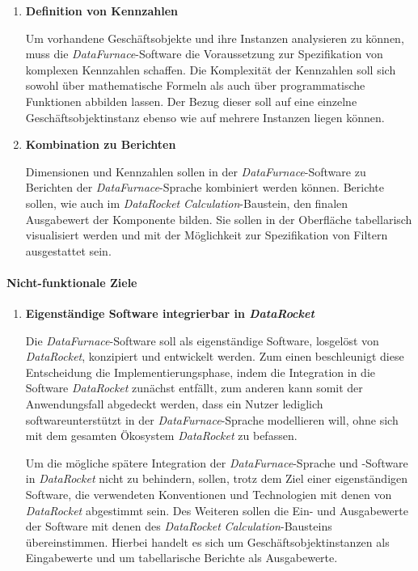 \documentclass[
  language=german, %
  type=bachelor%
]{isthesis}
\begin{document}
\begin{content}
\begin{enumerate}
    \item \textbf{Definition von Kennzahlen}

      Um vorhandene Geschäftsobjekte und ihre Instanzen analysieren zu können,
      muss die \textit{DataFurnace}-Software die Voraussetzung zur
      Spezifikation von komplexen Kennzahlen schaffen. Die Komplexität der
      Kennzahlen soll sich sowohl über mathematische Formeln als auch
      über programmatische Funktionen abbilden lassen. Der Bezug dieser soll auf
      eine einzelne Geschäftsobjektinstanz ebenso wie auf mehrere Instanzen
      liegen können.

    \item \textbf{Kombination zu Berichten}

      Dimensionen und Kennzahlen sollen in der \textit{DataFurnace}-Software zu
      Berichten der \textit{DataFurnace}-Sprache kombiniert werden können.
      Berichte sollen, wie auch im \textit{DataRocket}
      \textit{Calculation}-Baustein, den finalen Ausgabewert der Komponente
      bilden. Sie sollen in der Oberfläche tabellarisch visualisiert werden und
      mit der Möglichkeit zur Spezifikation von Filtern ausgestattet sein.

  \end{enumerate}

  \paragraph{Nicht-funktionale Ziele}
  \begin{enumerate}

    \item \textbf{Eigenständige Software integrierbar in \textit{DataRocket}}

      Die \textit{DataFurnace}-Software soll als eigenständige Software,
      losgelöst von \textit{DataRocket}, konzipiert und entwickelt werden. Zum
      einen beschleunigt diese Entscheidung die Implementierungsphase, indem
      die Integration in die Software \textit{DataRocket} zunächst entfällt,
      zum anderen kann somit der Anwendungsfall abgedeckt werden, dass ein Nutzer
      lediglich softwareunterstützt in der \textit{DataFurnace}-Sprache
      modellieren will, ohne sich mit dem gesamten Ökosystem
      \textit{DataRocket} zu befassen.

      Um die mögliche spätere Integration der \textit{DataFurnace}-Sprache und
      -Software in \textit{DataRocket} nicht zu behindern, sollen, trotz dem
      Ziel einer eigenständigen Software, die verwendeten Konventionen und
      Technologien mit denen von \textit{DataRocket} abgestimmt sein.  Des
      Weiteren sollen die Ein- und Ausgabewerte der Software mit denen des
      \textit{DataRocket} \textit{Calculation}-Bausteins übereinstimmen.
      Hierbei handelt es sich um Geschäftsobjektinstanzen als Eingabewerte und
      um tabellarische Berichte als Ausgabewerte.


\end{enumerate}
\end{content}
\end{document}
